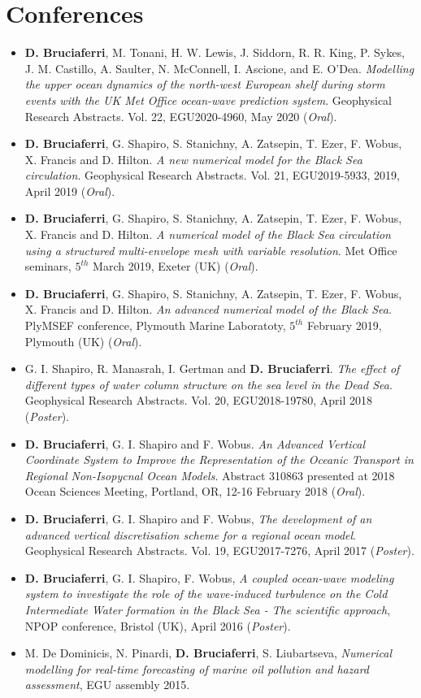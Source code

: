\documentclass[a4paper, oneside, final]{scrartcl}
\begin{document}
\section{Conferences}
\noindent
\normalsize
\begin{itemize}
\item \textbf{D. Bruciaferri}, M. Tonani, H. W. Lewis, J. Siddorn, R. R. King, P. Sykes, J. M. Castillo, A. Saulter, N. McConnell, I. Ascione, and E. O'Dea.  \textit{Modelling the upper ocean dynamics of the north-west European shelf during storm events with the UK Met Office ocean-wave prediction system}. Geophysical Research Abstracts. Vol. 22, EGU2020-4960, May 2020 (\textit{Oral}).
\item \textbf{D. Bruciaferri}, G. Shapiro, S. Stanichny, A. Zatsepin, T. Ezer, F. Wobus, X. Francis and D. Hilton. \textit{A new numerical model for the Black Sea circulation}. Geophysical Research Abstracts. Vol. 21, EGU2019-5933, 2019, April 2019 (\textit{Oral}).
\item \textbf{D. Bruciaferri}, G. Shapiro, S. Stanichny, A. Zatsepin, T. Ezer, F. Wobus, X. Francis and D. Hilton. \textit{A numerical model of the Black Sea circulation using a structured multi-envelope mesh with variable resolution}. Met Office seminars, $5^{th}$ March 2019, Exeter (UK) (\textit{Oral}).
\item \textbf{D. Bruciaferri}, G. Shapiro, S. Stanichny, A. Zatsepin, T. Ezer, F. Wobus, X. Francis and D. Hilton. \textit{An advanced numerical model of the Black Sea}. PlyMSEF conference, Plymouth Marine Laboratoty, $5^{th}$ February 2019, Plymouth (UK) (\textit{Oral}).
\item G. I. Shapiro, R. Manasrah, I. Gertman and \textbf{D. Bruciaferri}. \textit{The effect of different types of water column structure on the sea level in the Dead Sea}. Geophysical Research Abstracts. Vol. 20, EGU2018-19780, April 2018 (\textit{Poster}).
\item \textbf{D. Bruciaferri}, G. I. Shapiro and F. Wobus. \textit{An Advanced Vertical Coordinate System to Improve the Representation of the Oceanic Transport in Regional Non-Isopycnal Ocean Models}. Abstract 310863 presented at 2018 Ocean Sciences Meeting, Portland, OR, 12-16 February 2018 (\textit{Oral}).
\item \textbf{D. Bruciaferri}, G. I. Shapiro and F. Wobus, \textit{The development of an advanced vertical discretisation scheme for a regional ocean model}. Geophysical Research Abstracts. Vol. 19, EGU2017-7276, April 2017 (\textit{Poster}).
\item \textbf{D. Bruciaferri}, G. I. Shapiro, F. Wobus, \textit{A coupled ocean-wave modeling system to investigate the role of the wave-induced turbulence on the Cold Intermediate Water formation in the Black Sea - The scientific approach}, NPOP conference, Bristol (UK), April 2016 (\textit{Poster}).
\item M. De Dominicis, N. Pinardi, \textbf{D. Bruciaferri}, S. Liubartseva, \textit{Numerical modelling for real-time forecasting of marine oil pollution and hazard assessment}, EGU assembly 2015.
\end{itemize}
\end{document}
